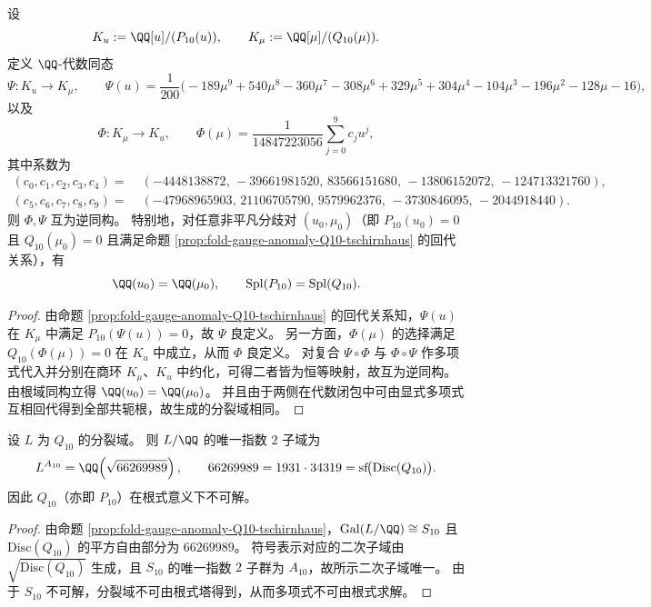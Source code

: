 \begin{proposition}\label{prop:fold-gauge-anomaly-P10-Q10-tschirnhaus-inverse}
设
\[
K_u:=\QQ[u]/(P_{10}(u)),\qquad K_{\mu}:=\QQ[\mu]/(Q_{10}(\mu)).
\]
定义 \(\QQ\)-代数同态
\[
\Psi:K_u\to K_{\mu},\qquad
\Psi(u)=\frac{1}{200}\bigl(-189\mu^{9}+540\mu^{8}-360\mu^{7}-308\mu^{6}+329\mu^{5}+304\mu^{4}-104\mu^{3}-196\mu^{2}-128\mu-16\bigr),
\]
以及
\[
\Phi:K_{\mu}\to K_u,\qquad
\Phi(\mu)=\frac{1}{14847223056}\sum_{j=0}^{9}c_j u^{j},
\]
其中系数为
\[
\begin{aligned}
(c_0,c_1,c_2,c_3,c_4)=\;&(-4448138872,\,-39661981520,\,83566151680,\,-13806152072,\,-124713321760),\\
(c_5,c_6,c_7,c_8,c_9)=\;&(-47968965903,\,21106705790,\,9579962376,\,-3730846095,\,-2044918440).
\end{aligned}
\]
则 \(\Phi,\Psi\) 互为逆同构。
特别地，对任意非平凡分歧对 \((u_0,\mu_0)\)（即 \(P_{10}(u_0)=0\) 且 \(Q_{10}(\mu_0)=0\) 且满足命题 \ref{prop:fold-gauge-anomaly-Q10-tschirnhaus} 的回代关系），有
\[
\QQ(u_0)=\QQ(\mu_0),
\qquad
\mathrm{Spl}(P_{10})=\mathrm{Spl}(Q_{10}).
\]
\end{proposition}
\begin{proof}
由命题 \ref{prop:fold-gauge-anomaly-Q10-tschirnhaus} 的回代关系知，\(\Psi(u)\) 在 \(K_{\mu}\) 中满足 \(P_{10}(\Psi(u))=0\)，故 \(\Psi\) 良定义。
另一方面，\(\Phi(\mu)\) 的选择满足 \(Q_{10}(\Phi(\mu))=0\) 在 \(K_u\) 中成立，从而 \(\Phi\) 良定义。
对复合 \(\Psi\circ\Phi\) 与 \(\Phi\circ\Psi\) 作多项式代入并分别在商环 \(K_{\mu}\)、\(K_u\) 中约化，可得二者皆为恒等映射，故互为逆同构。
由根域同构立得 \(\QQ(u_0)=\QQ(\mu_0)\)。
并且由于两侧在代数闭包中可由显式多项式互相回代得到全部共轭根，故生成的分裂域相同。
\end{proof}

\begin{corollary}[判别式核不变量与唯一二次子域]\label{cor:fold-gauge-anomaly-Q10-unique-quadratic-subfield}
设 \(L\) 为 \(Q_{10}\) 的分裂域。
则 \(L/\QQ\) 的唯一指数 \(2\) 子域为
\[
L^{A_{10}}=\QQ\!\left(\sqrt{66269989}\right),
\qquad
66269989=1931\cdot 34319=\mathrm{sf}\!\bigl(\mathrm{Disc}(Q_{10})\bigr).
\]
因此 \(Q_{10}\)（亦即 \(P_{10}\)）在根式意义下不可解。
\end{corollary}
\begin{proof}
由命题 \ref{prop:fold-gauge-anomaly-Q10-tschirnhaus}，\(\mathrm{Gal}(L/\QQ)\cong S_{10}\) 且 \(\mathrm{Disc}(Q_{10})\) 的平方自由部分为 \(66269989\)。
符号表示对应的二次子域由 \(\sqrt{\mathrm{Disc}(Q_{10})}\) 生成，且 \(S_{10}\) 的唯一指数 \(2\) 子群为 \(A_{10}\)，故所示二次子域唯一。
由于 \(S_{10}\) 不可解，分裂域不可由根式塔得到，从而多项式不可由根式求解。
\end{proof}
